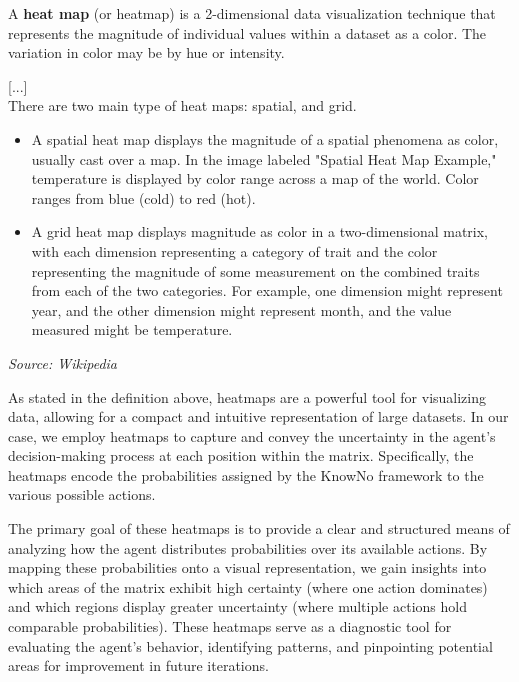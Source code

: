 \begin{blockquote}
  A \textbf{heat map} (or heatmap) is a 2-dimensional data visualization
  technique that represents the magnitude of individual values within a dataset
  as a color. The variation in color may be by hue or intensity.

  [...]\\There are two main type of heat maps: spatial, and grid.
  \begin{itemize}
    \item A spatial heat map displays the magnitude of a spatial phenomena as color,
      usually cast over a map. In the image labeled "Spatial Heat Map Example,"
      temperature is displayed by color range across a map of the world. Color ranges
      from blue (cold) to red (hot).

    \item A grid heat map displays magnitude as color in a two-dimensional matrix,
      with each dimension representing a category of trait and the color
      representing the magnitude of some measurement on the combined traits from
      each of the two categories. For example, one dimension might represent
      year, and the other dimension might represent month, and the value
      measured might be temperature.
  \end{itemize}
  \emph{Source: Wikipedia\footnotemark}
\end{blockquote}

As stated in the definition above, heatmaps are a powerful tool for visualizing data,
allowing for a compact and intuitive representation of large datasets. In our case,
we employ heatmaps to capture and convey the uncertainty in the agent's decision-making
process at each position within the matrix. Specifically, the heatmaps encode
the probabilities assigned by the KnowNo framework to the various possible
actions.

The primary goal of these heatmaps is to provide a clear and structured means of
analyzing how the agent distributes probabilities over its available actions. By
mapping these probabilities onto a visual representation, we gain insights into
which areas of the matrix exhibit high certainty (where one action dominates)
and which regions display greater uncertainty (where multiple actions hold comparable
probabilities). These heatmaps serve as a diagnostic tool for evaluating the agent's
behavior, identifying patterns, and pinpointing potential areas for improvement in
future iterations.

